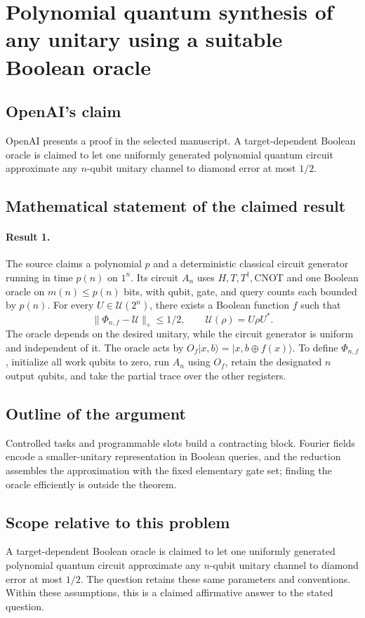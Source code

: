 \documentclass[11pt]{article}
\begin{document}
\section*{Polynomial quantum synthesis of any unitary using a suitable Boolean oracle}

\subsection{OpenAI's claim}
OpenAI presents a proof in the selected manuscript. A target-dependent Boolean oracle is claimed to let one uniformly generated polynomial quantum circuit approximate any $n$-qubit unitary channel to diamond error at most $1/2$.

\subsection{Mathematical statement of the claimed result}
\paragraph{Result 1.} The source claims a polynomial \(p\) and a deterministic classical circuit generator running in time \(p(n)\) on \(1^n\). Its circuit \(A_n\) uses \(H,T,T^\dagger,\mathrm{CNOT}\) and one Boolean oracle on \(m(n)\le p(n)\) bits, with qubit, gate, and query counts each bounded by \(p(n)\). For every \(U\in\mathcal U(2^n)\), there exists a Boolean function \(f\) such that
\[
 \|\Phi_{n,f}-\mathcal U\|_\diamond\le1/2,
 \qquad\mathcal U(\rho)=U\rho U^*.
\]
The oracle depends on the desired unitary, while the circuit generator is uniform and independent of it. The oracle acts by $O_f|x,b\rangle=|x,b\oplus f(x)\rangle$. To define $\Phi_{n,f}$, initialize all work qubits to zero, run $A_n$ using $O_f$, retain the designated $n$ output qubits, and take the partial trace over the other registers.

\subsection{Outline of the argument}
Controlled tasks and programmable slots build a contracting block. Fourier fields encode a smaller-unitary representation in Boolean queries, and the reduction assembles the approximation with the fixed elementary gate set; finding the oracle efficiently is outside the theorem.

\subsection{Scope relative to this problem}
A target-dependent Boolean oracle is claimed to let one uniformly generated polynomial quantum circuit approximate any $n$-qubit unitary channel to diamond error at most $1/2$. The question retains these same parameters and conventions. Within these assumptions, this is a claimed affirmative answer to the stated question.
\end{document}
